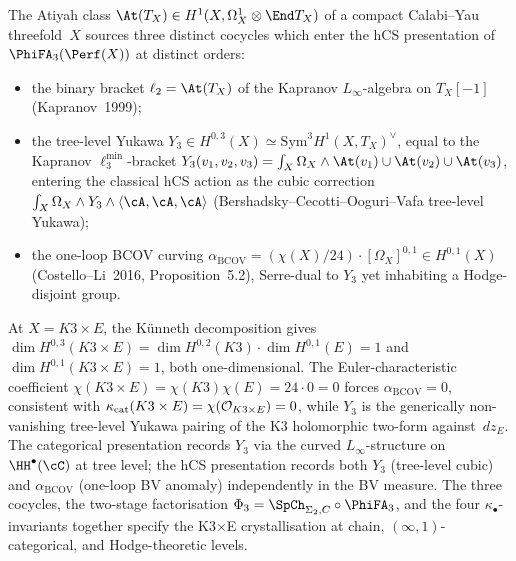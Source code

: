 \begin{remark}
\label{rem:v3-intro-three-atiyah-cocycles}
The Atiyah class $\At(T_X) \in H^1(X, \Omega^1_X \otimes \End T_X)$ of a compact Calabi--Yau threefold~$X$ sources three distinct cocycles which enter the hCS presentation of $\PhiFA_3(\Perf(X))$ at distinct orders:
\begin{itemize}
\item the binary bracket $\ell_2 = \At(T_X)$ of the Kapranov $L_\infty$-algebra on $T_X[-1]$ (Kapranov~1999);
\item the tree-level Yukawa $Y_3 \in H^{0,3}(X) \simeq \mathrm{Sym}^3 H^1(X, T_X)^\vee$, equal to the Kapranov $\ell_3^{\min}$-bracket $Y_3(v_1,v_2,v_3) = \int_X \Omega_X \wedge \At(v_1) \cup \At(v_2) \cup \At(v_3)$, entering the classical hCS action as the cubic correction $\int_X \Omega_X \wedge Y_3 \wedge \langle \cA, \cA, \cA \rangle$ (Bershadsky--Cecotti--Ooguri--Vafa tree-level Yukawa);
\item the one-loop BCOV curving $\alpha_{\mathrm{BCOV}} = (\chi(X)/24) \cdot [\Omega_X]^{0,1} \in H^{0,1}(X)$ (Costello--Li~2016, Proposition~5.2), Serre-dual to $Y_3$ yet inhabiting a Hodge-disjoint group.
\end{itemize}
At $X = K3 \times E$, the K\"unneth decomposition gives $\dim H^{0,3}(K3 \times E) = \dim H^{0,2}(K3) \cdot \dim H^{0,1}(E) = 1$ and $\dim H^{0,1}(K3 \times E) = 1$, both one-dimensional. The Euler-characteristic coefficient $\chi(K3 \times E) = \chi(K3)\chi(E) = 24 \cdot 0 = 0$ forces $\alpha_{\mathrm{BCOV}} = 0$, consistent with $\kappa_{\mathrm{cat}}(K3 \times E) = \chi(\mathcal{O}_{K3 \times E}) = 0$, while $Y_3$ is the generically non-vanishing tree-level Yukawa pairing of the K3 holomorphic two-form against~$dz_E$. The categorical presentation records $Y_3$ via the curved $L_\infty$-structure on $\HH^\bullet(\cC)$ at tree level; the hCS presentation records both $Y_3$ (tree-level cubic) and $\alpha_{\mathrm{BCOV}}$ (one-loop BV anomaly) independently in the BV measure. The three cocycles, the two-stage factorisation $\Phi_3 = \SpCh_{\Sigma_2, C} \circ \PhiFA_3$, and the four $\kappa_\bullet$-invariants together specify the K3$\times$E crystallisation at chain, $(\infty,1)$-categorical, and Hodge-theoretic levels.
\end{remark}


